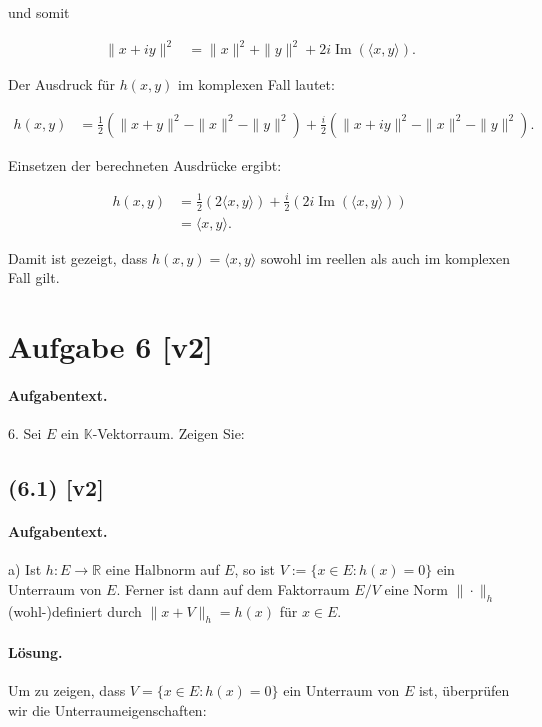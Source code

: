 \documentclass[11pt,a4paper]{article}
\begin{document}
und somit

\begin{align*}
\|x+iy\|^2 &= \|x\|^2 + \|y\|^2 + 2i \operatorname{Im}(\langle x, y \rangle).
\end{align*}

Der Ausdruck für $h(x, y)$ im komplexen Fall lautet:

\begin{align*}
h(x, y) &= \frac{1}{2}(\|x+y\|^2 - \|x\|^2 - \|y\|^2) + \frac{i}{2}(\|x+iy\|^2 - \|x\|^2 - \|y\|^2).
\end{align*}

Einsetzen der berechneten Ausdrücke ergibt:

\begin{align*}
h(x, y) &= \frac{1}{2}(2 \langle x, y \rangle) + \frac{i}{2}(2i \operatorname{Im}(\langle x, y \rangle)) \\
&= \langle x, y \rangle.
\end{align*}

Damit ist gezeigt, dass $h(x, y) = \langle x, y \rangle$ sowohl im reellen als auch im komplexen Fall gilt.


\section*{Aufgabe 6 [v2]}
\paragraph{Aufgabentext.}
6. Sei $E$ ein $\mathbb{K}$-Vektorraum. Zeigen Sie:

\subsection*{(6.1) [v2]}
\paragraph{Aufgabentext.}
a) Ist $h: E \rightarrow \mathbb{R}$ eine Halbnorm auf $E$, so ist $V:=\{x \in E: h(x)=0\}$ ein Unterraum von $E$. Ferner ist dann auf dem Faktorraum $E / V$ eine Norm $\|\cdot\|_h$ (wohl-)definiert durch $\|x+V\|_h=h(x)$ für $x \in E$.

\paragraph{Lösung.}
Um zu zeigen, dass $V = \{x \in E : h(x) = 0\}$ ein Unterraum von $E$ ist, überprüfen wir die Unterraumeigenschaften:
\end{document}
